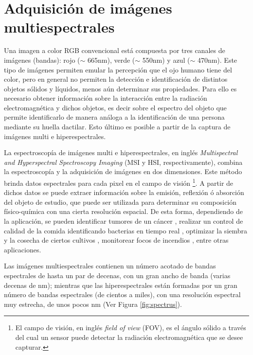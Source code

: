 
\singlespacing
\section{Adquisición de imágenes multiespectrales}
\label{sec:motivacion}


\hspace{0.5cm}Una imagen a color RGB convencional está compuesta por tres 
canales de 
imágenes (bandas): rojo 
($\sim$ 665nm), verde ($\sim$ 550nm) y azul ($\sim$ 470nm). Este tipo de 
imágenes permiten emular la percepción que el ojo humano tiene del color, pero 
en general no permiten la detección e identificación de distintos objetos 
sólidos y 
líquidos, menos 
aún determinar sus propiedades. Para ello 
es necesario obtener información sobre la interacción entre la radiación electromagnética y dichos objetos, es decir sobre el espectro del objeto que permite identificarlo de manera análoga a la identificación de una persona mediante su huella dactilar. Esto último es posible a partir de la captura de imágenes multi e hiperespectrales.

La espectroscopía de imágenes multi e hiperespectrales, en inglés \textit{Multispectral and Hyperspectral Spectroscopy
Imaging} (MSI y HSI, respectivamente), combina la espectroscopía y la adquisición de imágenes en dos dimensiones.
Este método brinda datos espectrales para cada pixel en el campo de visión \footnote{El campo de visión, en inglés \textit{field of view} (FOV), es el ángulo sólido a través del cual un sensor puede
detectar la radiación electromagnética que se desee capturar.}. A partir de
dichos datos se puede extraer información sobre la emisión, reflexión ó absorción del objeto de estudio, que puede ser utilizada para determinar su composición físico-química con una cierta
resolución espacial. De esta forma, dependiendo de la aplicación, se pueden identificar tumores de un cáncer \cite{canc}, realizar un
control de calidad de la comida identificando bacterias en tiempo real \cite{food}, optimizar la siembra y la cosecha de ciertos cultivos \cite{cultiv}, monitorear focos de incendios \cite{fire}, entre otras
aplicaciones.

Las imágenes multiespectrales contienen un número acotado de bandas espectrales 
de hasta un par de decenas, con un gran ancho de banda (varias decenas de nm); 
mientras que las hiperespectrales están formadas por un gran número de bandas 
espectrales (de cientos a miles), con una resolución espectral muy estrecha, de 
unos pocos nm (Ver Figura \ref{fig:spectrus}).


